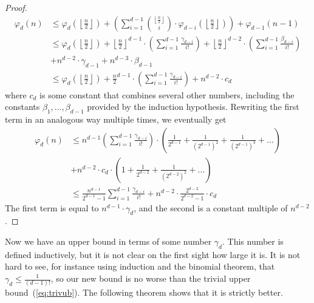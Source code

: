\documentclass[11pt,a4paper]{article}
\begin{document}
\begin{proof}
    \begin{align*}
        \varphi_d(n) &\leq \varphi_d \left( \left\lfloor \frac{n}{2} \right\rfloor \right)
            + \left(\sum_{i=1}^{d-1}\binom{ \left\lfloor \frac{n}{2} \right\rfloor  }{i} \cdot \varphi_{d-i}\left( \left\lfloor\frac{n}{2} \right\rfloor  \right)\right) +\varphi_{d-1}(n-1)\\
            &\leq \varphi_d \left( \left\lfloor \frac{n}{2} \right\rfloor  \right)
            + \left\lfloor \frac{n}{2} \right\rfloor ^{d-1} \cdot \left(\sum_{i=1}^{d-1} \frac{\gamma_{d-i}}{i!}\right)
            + \left\lfloor \frac{n}{2} \right\rfloor ^{d-2} \cdot \left(\sum_{i=1}^{d-1} \frac{\beta_{d-i}}{i!}\right) \\
            &+ n^{d-2}\cdot \gamma_{d-1} + n^{d-3}\cdot \beta_{d-1}\\
            &\leq \varphi_d \left( \left\lfloor \frac{n}{2} \right\rfloor \right)
            + {\frac{n}{2}}^{d-1} \cdot \left(\sum_{i=1}^{d-1} \frac{\gamma_{d-i}}{i!}\right) + n^{d-2}\cdot c_d
    \end{align*}
where $c_d$ is some constant that combines several other numbers, including the constants $\beta_1,\dots,\beta_{d-1}$ provided by the induction hypothesis.
    Rewriting the first term in an analogous way multiple times, we eventually get
    \begin{align*}
        \varphi_d(n) &\leq n^{d-1} \left(\sum_{i=1}^{d-1} \frac{\gamma_{d-i}}{i!}\right)\cdot \left(\frac{1}{2^{d-1}}+ \frac{1}{(2^{d-1})^2}+\frac{1}{(2^{d-1})^3}+\dots\right) \\
        &+ n^{d-2}\cdot c_d \cdot \left(1+\frac{1}{2^{d-2}}+ \frac{1}{(2^{d-2})^2}+\dots\right)\\
        &\leq \frac{n^{d-1}}{2^{d-1}-1} \sum_{i=1}^{d-1} \frac{\gamma_{d-i}}{i!}
        + n^{d-2}\cdot \frac{2^{d-2}}{2^{d-2}-1}\cdot c_d
    \end{align*}
The first term is equal to $n^{d-1}\cdot \gamma_d$, and the second is a constant multiple of $n^{d-2}$.
\end{proof}

Now we have an upper bound in terms of some number $\gamma_d$. This number is defined inductively, but it is not clear on the first sight how large it is. It is not hard to see, for instance using induction and the binomial theorem, that $\gamma_d\leq \frac{1}{(d-1)!}$, so our new bound is no worse than the trivial upper bound~(\ref{eq:trivub}). The following theorem shows that it is strictly better.
\end{document}

